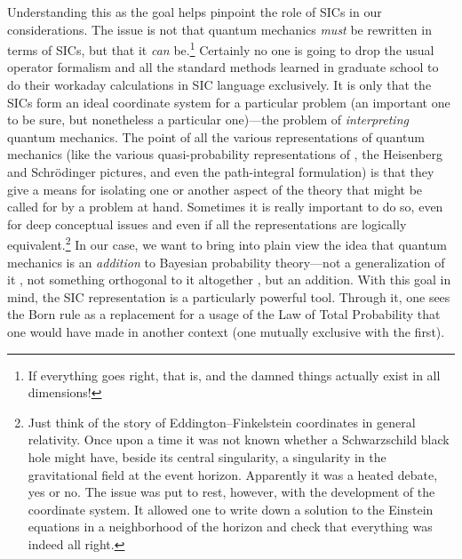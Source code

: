 \documentclass[aps,pra,superscriptaddress,10pt,tightenlines,twocolumn,nofootinbib]{revtex4}
\begin{document}
Understanding this as the goal helps pinpoint the role of SICs in our considerations.  The issue is not that quantum mechanics {\it must\/} be rewritten in terms of SICs, but that it {\it can\/} be.\footnote{If everything goes right, that is, and the damned things actually exist in all dimensions!}  Certainly no one is going to drop the usual operator formalism and all the standard methods learned in graduate school to do their workaday calculations in SIC language exclusively.  It is only that the SICs form an ideal coordinate system for a particular problem (an important one to be sure, but nonetheless a particular one)---the problem of {\it interpreting\/} quantum mechanics.  The point of all the various representations of quantum mechanics (like the various quasi-probability representations of \cite{Ferrie09}, the Heisenberg and Schr\"odinger pictures, and even the path-integral formulation) is that they give a means for isolating one or another aspect of the theory that might be called for by a problem at hand.  Sometimes it is really important to do so, even for deep conceptual issues and even if all the representations are logically equivalent.\footnote{Just think of the story of Eddington--Finkelstein coordinates in general relativity.  Once upon a time it was not known whether a Schwarzschild black hole might have, beside its central singularity, a singularity in the gravitational field at the event horizon.  Apparently it was a heated debate, yes or no. The issue was put to rest, however, with the development of the coordinate system.  It allowed one to write down a solution to the Einstein equations in a neighborhood of the horizon and check that everything was indeed all right.}  In our case, we want to bring into plain view the idea that quantum mechanics is an {\it addition\/} to Bayesian probability theory---not a generalization of it \cite{Bub07}, not something orthogonal to it altogether \cite{Jozsa04}, but an addition.  With this goal in mind, the SIC representation is a particularly powerful tool.  Through it, one sees the Born rule as a replacement for a usage of the Law of Total Probability that one would have made in another context (one mutually exclusive with the first).
\end{document}
